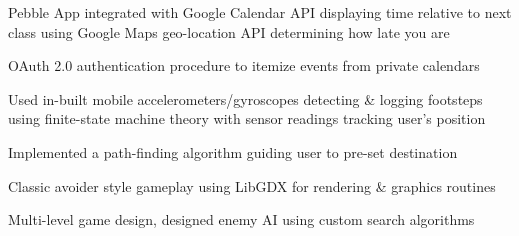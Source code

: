 \begin{minipage}[t]{0.66\textwidth}
        \begin{tightitemize}
                \item Pebble App integrated with Google Calendar API displaying time relative to next class using Google Maps geo-location API determining how late you are
                \item OAuth 2.0 authentication procedure to itemize events from private calendars
        \end{tightitemize}

        \sectionspace %



        \begin{tightitemize}
                \item Used in-built mobile accelerometers/gyroscopes detecting \& logging footsteps using finite-state machine theory with sensor readings tracking user’s position
                \item Implemented a path-finding algorithm guiding user to pre-set destination 
        \end{tightitemize}

        \sectionspace %



        \begin{tightitemize}
                \item Classic avoider style gameplay using LibGDX for rendering \& graphics routines
                \item Multi-level game design, designed enemy AI using custom search algorithms
        \end{tightitemize}


\end{minipage}
